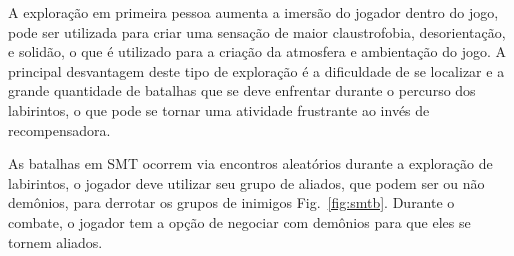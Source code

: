 A exploração em primeira pessoa aumenta a imersão do jogador dentro do jogo, pode ser utilizada para criar uma sensação de maior claustrofobia, desorientação, e solidão, o que é utilizado para a criação da atmosfera e ambientação do jogo. A principal desvantagem deste tipo de exploração é a dificuldade de se localizar e a grande quantidade de batalhas que se deve enfrentar durante o percurso dos labirintos, o que pode se tornar uma atividade frustrante ao invés de recompensadora.

As batalhas em SMT ocorrem via encontros aleatórios durante a exploração de labirintos, o jogador deve utilizar seu grupo de aliados, que podem ser ou não demônios, para derrotar os grupos de inimigos Fig.~\ref{fig:smtb}. Durante o combate, o jogador tem a opção de negociar com demônios para que eles se tornem aliados.


